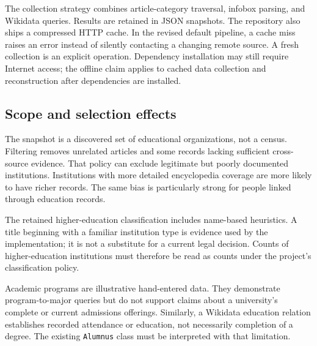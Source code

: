 \documentclass[11pt,a4paper]{article}
\newcommand{\term}[1]{\texttt{#1}}
\begin{document}
The collection strategy combines article-category traversal, infobox parsing, and
Wikidata queries. Results are retained in JSON snapshots. The repository also ships a
compressed HTTP cache. In the revised default pipeline, a cache miss raises an error
instead of silently contacting a changing remote source. A fresh collection is an explicit
operation. Dependency installation may still require Internet access; the offline claim
applies to cached data collection and reconstruction after dependencies are installed.

\subsection{Scope and selection effects}
The snapshot is a discovered set of educational organizations, not a census. Filtering
removes unrelated articles and some records lacking sufficient cross-source evidence.
That policy can exclude legitimate but poorly documented institutions. Institutions with
more detailed encyclopedia coverage are more likely to have richer records. The same bias
is particularly strong for people linked through education records.

The retained higher-education classification includes name-based heuristics. A title
beginning with a familiar institution type is evidence used by the implementation; it is
not a substitute for a current legal decision. Counts of higher-education institutions
must therefore be read as counts under the project's classification policy.

Academic programs are illustrative hand-entered data. They demonstrate program-to-major
queries but do not support claims about a university's complete or current admissions
offerings. Similarly, a Wikidata education relation establishes recorded attendance or
education, not necessarily completion of a degree. The existing \term{Alumnus} class must
be interpreted with that limitation.
\end{document}
